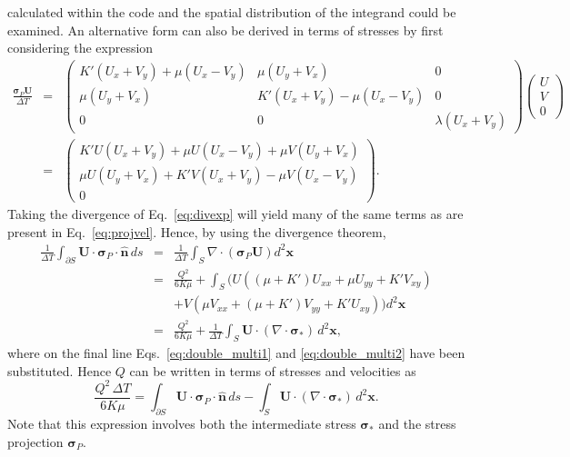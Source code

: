 \documentclass[11pt]{article}
\newcommand{\p}{\partial}
\newcommand{\bsig}{\boldsymbol\sigma}
\renewcommand{\vec}[1]{\mathbf{#1}}
\newcommand{\vnor}{\hat{\vec{n}}}
\newcommand{\Dsig}{\bsig_P}
\begin{document}
calculated within the code and the spatial distribution of the integrand could
be examined. An alternative form can also be derived in terms of stresses by
first considering the expression
\begin{eqnarray}
\frac{\Dsig \vec{U}}{\Delta T} &=& \left(
\begin{array}{ccc}
  K'(U_x+V_y) + \mu(U_x - V_y) & \mu (U_y+V_x) & 0 \\
  \mu(U_y+V_x) & K'(U_x + V_y) - \mu(U_x - V_y) & 0 \\
  0 & 0 & \lambda (U_x+V_y)
\end{array}
\right)
\left(
\begin{array}{c}
  U \\ V \\ 0
\end{array}
\right) \nonumber \\
&=& \left(
\begin{array}{c}
  K'U(U_x+V_y) + \mu U (U_x-V_y) + \mu V(U_y+V_x) \\
  \mu U (U_y+V_x) + K'V (U_x+V_y) - \mu V (U_x - V_y) \\
  0
\end{array}
\right). \label{eq:divexp}
\end{eqnarray}
Taking the divergence of Eq.~\ref{eq:divexp} will yield many of the same terms
as are present in Eq.~\ref{eq:projvel}. Hence, by using the divergence theorem,
\begin{eqnarray*}
  \frac{1}{\Delta T} \int_{\p S} \vec{U} \cdot \Dsig \cdot \vnor \, ds &=& \frac{1}{\Delta T} \int_S \nabla \cdot (\Dsig \vec{U}) d^2\vec{x} \\
   &=& \frac{Q^2}{6K\mu} +  \int_S \Big( U ( (\mu+K') U_{xx} + \mu U_{yy} + K'V_{xy}) \\
   &&+ V(\mu V_{xx} + (\mu+K') V_{yy} + K' U_{xy}) \Big) d^2 \vec{x} \\
   &=& \frac{Q^2}{6K\mu} + \frac{1}{\Delta T} \int_S \vec{U} \cdot (\nabla \cdot \bsig_*) \, d^2 \vec{x},
\end{eqnarray*}
where on the final line Eqs.~\ref{eq:double_multi1} and \ref{eq:double_multi2}
have been substituted. Hence $Q$ can be written in terms of stresses and
velocities as
\begin{equation}
  \frac{Q^2 \, \Delta T}{6K\mu} = \int_{\p S} \vec{U} \cdot \Dsig \cdot \vnor \,ds - \int_S \vec{U} \cdot (\nabla \cdot \bsig_*) \, d^2 \vec{x}.
\end{equation}
Note that this expression involves both the intermediate stress $\bsig_*$ and
the stress projection $\Dsig$.


\end{document}
